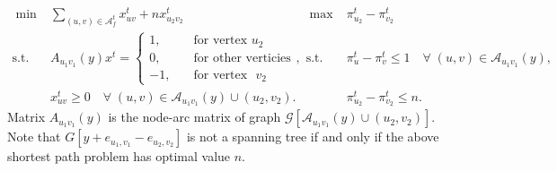 \documentclass[11pt]{article}
\newcommand{\G}{\mathcal{G}}
\newcommand{\Aa}{\mathcal{A}}
\begin{document}
\begin{align*}
\;\min\;& \sum_{(u,v)\in \mathcal{A}_f^t} x^t_{uv} + nx_{u_2v_2}^t \hspace{50pt} &\;\max\; &\pi_{u_2}^t - \pi_{v_2}^t \\
\text{s.t.~~}& A_{u_1v_1}(y)x^t = \begin{cases}
1, \quad & \text{for vertex~} u_2 \\
0, \quad & \text{for other verticies} \\
-1, \quad & \text{for vertex ~} v_2
\end{cases}, & \text{s.t.~~}& \pi_{u}^t - \pi_{v}^t \leq 1\quad\forall\; (u, v) \in \Aa_{u_1v_1}(y),\\
& x_{uv}^t \geq 0 \quad\forall \; (u, v)\in \Aa_{u_1v_1}(y)\cup (u_2, v_2). && \pi^t_{u_2} - \pi^t_{v_2} \leq n.
\end{align*}
Matrix $A_{u_1v_1}(y)$ is the node-arc matrix of graph $\G[\Aa_{u_1v_1}(y) \cup (u_2, v_2)]$. Note that $G[y + e_{u_1,v_1} - e_{u_2,v_2}]$ is not a spanning tree if and only if the above shortest path problem has optimal value $n$.


\end{document}
